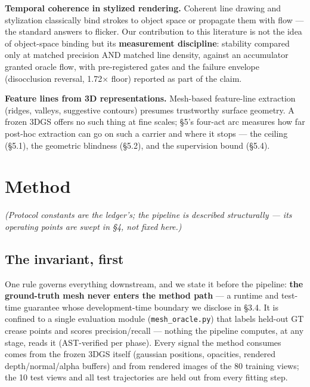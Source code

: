 \textbf{Temporal coherence in stylized rendering.} Coherent line drawing and stylization
classically bind strokes to object space or propagate them with flow --- the standard
answers to flicker. Our contribution to this literature is not the idea of object-space
binding but its \textbf{measurement discipline}: stability compared only at matched precision
AND matched line density, against an accumulator granted oracle flow, with pre-registered
gates and the failure envelope (disocclusion reversal, 1.72$\times$ floor) reported as part of
the claim.

\textbf{Feature lines from 3D representations.} Mesh-based feature-line extraction (ridges,
valleys, suggestive contours) presumes trustworthy surface geometry. A frozen 3DGS offers
no such thing at fine scales; \S5's four-act arc measures how far post-hoc extraction can
go on such a carrier and where it stops --- the ceiling (\S5.1), the geometric blindness
(\S5.2), and the supervision bound (\S5.4).

\section{Method}
\emph{(Protocol constants are the ledger's; the pipeline is described structurally --- its
operating points are swept in \S4, not fixed here.)}

\subsection{The invariant, first}
One rule governs everything downstream, and we state it before the pipeline: \textbf{the
ground-truth mesh never enters the method path} --- a runtime and test-time guarantee whose
development-time boundary we disclose in \S3.4. It is confined to a single evaluation
module (\texttt{mesh\_oracle.py}) that labels held-out GT crease points and scores
precision/recall --- nothing the pipeline computes, at any stage, reads it (AST-verified
per phase). Every signal the method consumes comes from the frozen 3DGS itself (gaussian
positions, opacities, rendered depth/normal/alpha buffers) and from rendered images of the
80 training views; the 10 test views and all test trajectories are held out from every
fitting step.

